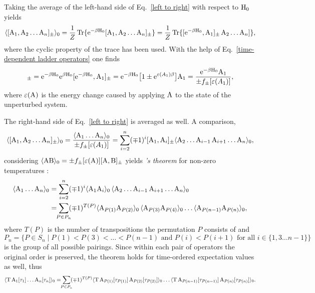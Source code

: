 Taking the average of the left-hand side of Eq.~\ref{left to right} with respect
to $\mathrm H_0$ yields
%
\begin{equation*}
    \langle[\mathrm A_1, \mathrm A_2 \dots \mathrm A_n]_\pm\rangle_0
    = \frac 1 Z \operatorname{Tr} \{
    \mathrm e^{-\beta \mathrm H_0} [ \mathrm A_1, \mathrm A_2 \dots \mathrm A_n ]_\pm \}
    = \frac 1 Z \operatorname{Tr} \{
    [\mathrm e^{-\beta \mathrm H_0}, \mathrm A_1]_\pm \, \mathrm A_2 \dots \mathrm A_n] \},
\end{equation*}
%
where the cyclic property of the trace has been used. With the help of
Eq.~\ref{time-dependent ladder operators} one finds
%
\begin{equation*}
    [\E^{-\beta \op H_0}, \op A_1]_\pm
    = \E^{-\beta \op H_0} \E^{\beta \op H_0} [\E^{-\beta \op H_0}, \op A_1]_\pm
    = \E^{-\beta \op H_0} \big[
        1 \pm \E^{\epsilon(A_1) \beta}
    \big] \op A_1
    = \frac{\E^{-\beta \op H_0} \op A_1}{\pm f_\pm[\epsilon(A_1)]},
\end{equation*}
%
where $\varepsilon(\mathrm A)$ is the energy change caused by applying $\mathrm A$ to the
state of the unperturbed system.

The right-hand side of Eq.~\ref{left to right} is averaged as well. A
comparison,
%
\begin{equation*}
    \langle[\mathrm A_1, \mathrm A_2 \dots \mathrm A_n]_\pm\rangle_0
    = \frac{\langle\mathrm A_1 \dots \mathrm A_n\rangle_0}{\pm f_\pm[\varepsilon(A_1)]}
    = \sum_{i = 2}^n (\mp 1)^i [\mathrm A_1, \mathrm A_i]_\pm
    \langle\mathrm A_2 \dots \mathrm A_{i - 1} \, \mathrm A_{i + 1} \dots \mathrm A_n\rangle_0,
\end{equation*}
%
considering $\langle\mathrm A \mathrm B\rangle_0 = \pm f_\pm[\varepsilon(\mathrm A)] [\mathrm A, \mathrm B]_\pm$
yields \emph{'s theorem} \cite{Wick50} for non-zero temperatures
\cite{Gaudin60}:
%
\begin{align*}
    \av{\op A_1 \dots \op A_n}_0 &=
    \sum_{i = 2}^n (\mp 1)^i \av{\op A_1 \op A_i}_0 \,
    \av{\op A_2 \dots \op A_{i - 1} \, \op A_{i + 1} \dots \op A_n}_0 \\
    &= \sum_{\mathclap{P \in P_n}} (\mp 1)^{T(P)}
    \av{\op A_{P(1)} \op A_{P(2)}}_0 \,
    \av{\op A_{P(3)} \op A_{P(4)}}_0 \dots
    \av{\op A_{P(n - 1)} \op A_{P(n)}}_0,
\end{align*}
%
where $T(P)$ is the number of transpositions the permutation $P$ consists of and
%
\begin{equation*}
    P_n = \{ P \in S_n \mid
        P(1) < P(3) < \dots < P(n - 1)
        \text{ and }
        P(i) < P(i + 1) \text{ for all $i \in \{1, 3 \dots n - 1\}$}
        \}
\end{equation*}
%
is the group of all possible pairings. Since within each pair of operators the
original order is preserved, the theorem holds for time-ordered expectation
values as well, thus
%
\begin{equation} \label{Wick theorem}
    \av{\op T \, \op A_1[\tau_1] \dots \op A_n[\tau_n]}_0 =
    \sum_{\mathclap{P \in P_n}} (\mp 1)^{T(P)}
    \av{\op T \, \op A_{P(1)}[\tau_{P(1)}] \,
    \op A_{P(2)}[\tau_{P(2)}]}_0 \dots
    \av{\op T \, \op A_{P(n - 1)}[\tau_{P(n - 1)}] \,
    \op A_{P(n)}[\tau_{P(n)}]}_0.
\end{equation}

